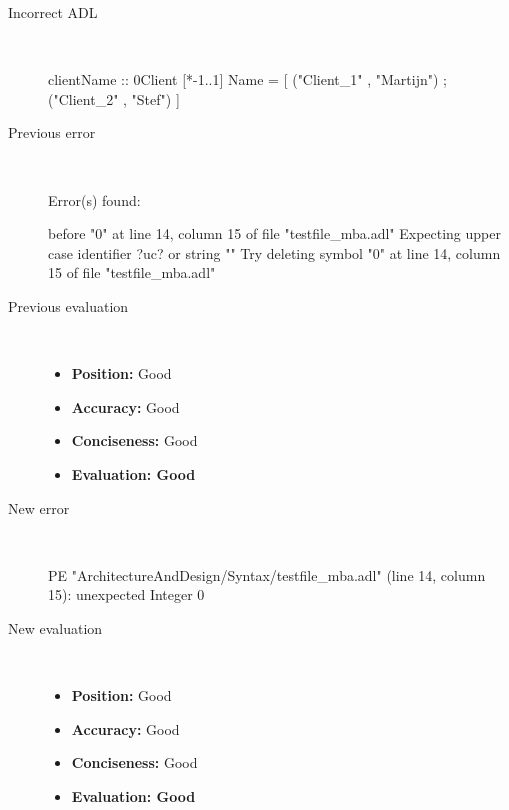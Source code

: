 \hrulefill

\begin{description}
  \item[Incorrect ADL]~\\
\begin{adl}
clientName :: 0Client [*-1..1] Name =
    [ ("Client_1"      , "Martijn")
    ; ("Client_2"      , "Stef")
    ]\end{adl}
  \item[Previous error]~\\
\begin{haskell}
Error(s) found:

before "0" at line 14, column 15 of file "testfile_mba.adl"
Expecting upper case identifier ?uc? or string ""
Try deleting symbol "0" at line 14, column 15 of file "testfile_mba.adl"\end{haskell}
  \item[Previous evaluation]~\\
    \begin{itemize}
    \item \textbf{Position:} Good
    \item \textbf{Accuracy:} Good
    \item \textbf{Conciseness:} Good
    \item \textbf{Evaluation: Good}
    \end{itemize}
  \item[New error]~\\
\begin{haskell}
PE "ArchitectureAndDesign/Syntax/testfile_mba.adl" (line 14, column 15):
unexpected Integer 0\end{haskell}
  \item[New evaluation]~\\
    \begin{itemize}
    \item \textbf{Position:} Good
    \item \textbf{Accuracy:} Good
    \item \textbf{Conciseness:} Good
    \item \textbf{Evaluation: Good}
    \end{itemize}
  \end{description}

\hrulefill

